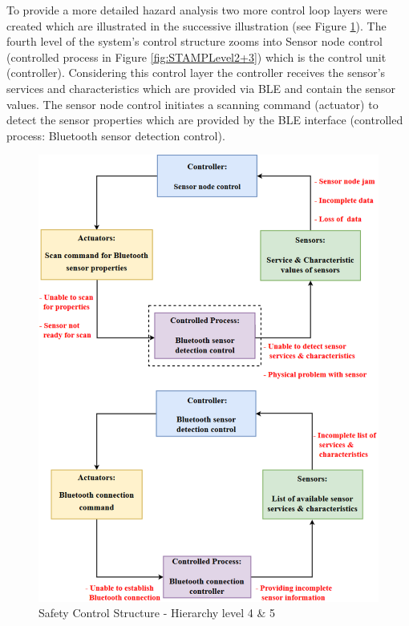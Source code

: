 \documentclass[10pt,journal,compsoc]{IEEEtran}
\begin{document}
	To provide a more detailed hazard analysis two more control loop layers were created which are illustrated in the successive illustration (see Figure  \ref{fig:STAMPLevel4+5}). The fourth level of the system's control structure zooms into Sensor node control (controlled process in Figure \ref{fig:STAMPLevel2+3}) which is the control unit (controller). Considering this control layer the controller receives the sensor's services and characteristics which are provided via BLE and contain the sensor values. The sensor node control initiates a scanning command (actuator) to detect the sensor properties which are provided by the BLE interface (controlled process: Bluetooth sensor detection control).  
	
	\begin{figure}[!ht]
		\centering
		\includegraphics[scale=0.365]{Images/STAMP4+5level(2).eps}
		\caption[Safety Control Structure - Hierarchy level 4 \& 5]{Safety Control Structure - Hierarchy level 4 \& 5}
		\label{fig:STAMPLevel4+5}
	\end{figure}
	
\end{document}
